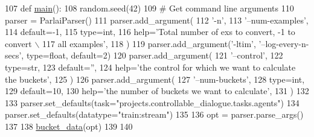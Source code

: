\begin{DoxyCode}
107 \textcolor{keyword}{def }\hyperlink{namespaceprojects_1_1controllable__dialogue_1_1get__bucket__lowerbounds_a872417720ce8a3ff988a11d934afbda8}{main}():
108     random.seed(42)
109     \textcolor{comment}{# Get command line arguments}
110     parser = ParlaiParser()
111     parser.add\_argument(
112         \textcolor{stringliteral}{'-n'},
113         \textcolor{stringliteral}{'--num-examples'},
114         default=-1,
115         type=int,
116         help=\textcolor{stringliteral}{'Total number of exs to convert, -1 to convert \(\backslash\)}
117 \textcolor{stringliteral}{                                all examples'},
118     )
119     parser.add\_argument(\textcolor{stringliteral}{'-ltim'}, \textcolor{stringliteral}{'--log-every-n-secs'}, type=float, default=2)
120     parser.add\_argument(
121         \textcolor{stringliteral}{'--control'},
122         type=str,
123         default=\textcolor{stringliteral}{''},
124         help=\textcolor{stringliteral}{'the control for which we want to calculate the buckets'},
125     )
126     parser.add\_argument(
127         \textcolor{stringliteral}{'--num-buckets'},
128         type=int,
129         default=10,
130         help=\textcolor{stringliteral}{'the number of buckets we want to calculate'},
131     )
132 
133     parser.set\_defaults(task=\textcolor{stringliteral}{"projects.controllable\_dialogue.tasks.agents"})
134     parser.set\_defaults(datatype=\textcolor{stringliteral}{"train:stream"})
135 
136     opt = parser.parse\_args()
137 
138     \hyperlink{namespaceprojects_1_1controllable__dialogue_1_1get__bucket__lowerbounds_aeba9a3a9932797d722c5ff9d0991a87e}{bucket\_data}(opt)
139 
140 
\end{DoxyCode}
